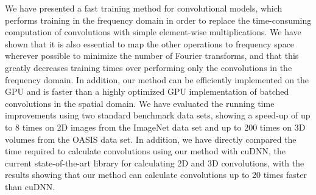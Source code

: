 We have presented a fast training method for convolutional models, which
performs training in the frequency domain in order to replace the time-consuming
computation of convolutions with simple element-wise multiplications. We have
shown that it is also essential to map the other operations to frequency space
wherever possible to minimize the number of Fourier transforms, and that this
greatly decreases training times over performing only the convolutions in the
frequency domain. In addition, our method can be efficiently implemented on the
GPU and is faster than a highly optimized GPU implementation of batched
convolutions in the spatial domain. We have evaluated the running time
improvements using two standard benchmark data sets, showing a speed-up of up to
8 times on 2D images from the ImageNet data set and up to 200 times on 3D
volumes from the OASIS data set. In addition, we have directly compared the time
required to calculate convolutions using our method with cuDNN, the current
state-of-the-art library for calculating 2D and 3D convolutions, with the
results showing that our method can calculate convolutions up to 20 times faster
than cuDNN.

